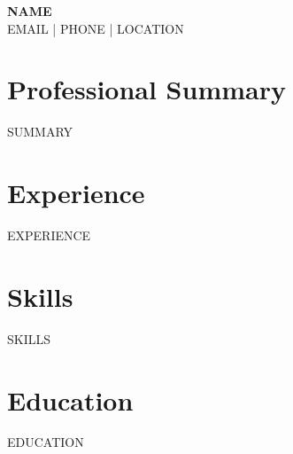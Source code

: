 \documentclass[11pt]{article}
\begin{document}
\begin{center}
    \textbf{\Large {NAME}}\\
    {EMAIL} | {PHONE} | {LOCATION}
\end{center}

\vspace{0.5em}
\section*{Professional Summary}
{SUMMARY}

\section*{Experience}
{EXPERIENCE}

\section*{Skills}
{SKILLS}

\section*{Education}
{EDUCATION}
\end{document}
